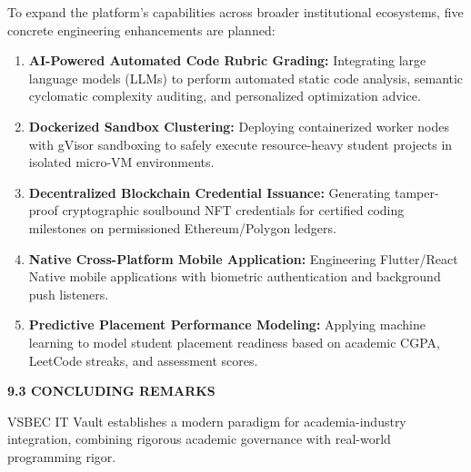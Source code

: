 {To expand the platform's capabilities across broader institutional ecosystems, five concrete engineering enhancements are planned:
\begin{enumerate}[noitemsep,topsep=2pt,leftmargin=*]
  \item \textbf{AI-Powered Automated Code Rubric Grading:} Integrating large language models (LLMs) to perform automated static code analysis, semantic cyclomatic complexity auditing, and personalized optimization advice.
  \item \textbf{Dockerized Sandbox Clustering:} Deploying containerized worker nodes with gVisor sandboxing to safely execute resource-heavy student projects in isolated micro-VM environments.
  \item \textbf{Decentralized Blockchain Credential Issuance:} Generating tamper-proof cryptographic soulbound NFT credentials for certified coding milestones on permissioned Ethereum/Polygon ledgers.
  \item \textbf{Native Cross-Platform Mobile Application:} Engineering Flutter/React Native mobile applications with biometric authentication and background push listeners.
  \item \textbf{Predictive Placement Performance Modeling:} Applying machine learning to model student placement readiness based on academic CGPA, LeetCode streaks, and assessment scores.
\end{enumerate}

\vspace{0.4cm}
{\fontsize{14pt}{18pt}\selectfont\bfseries 9.3 CONCLUDING REMARKS\par}
\vspace{0.2cm}
VSBEC IT Vault establishes a modern paradigm for academia-industry integration, combining rigorous academic governance with real-world programming rigor.\par}
\newpage
